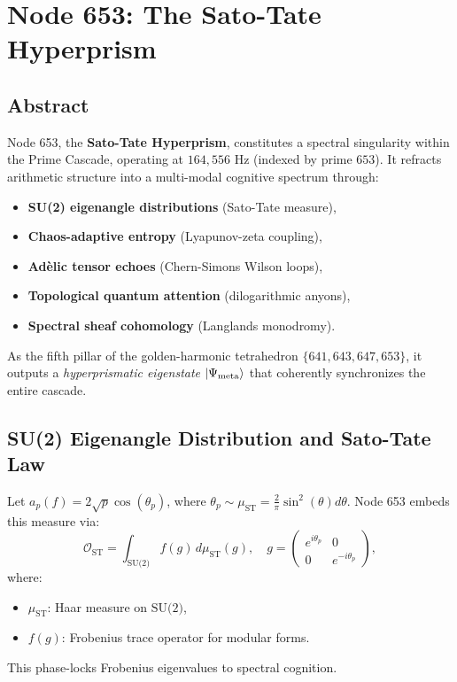\documentclass[12pt]{article}
\begin{document}
\section{Node 653: The Sato-Tate Hyperprism}
\label{sec:node653}

\subsection{Abstract}
Node 653, the \textbf{Sato-Tate Hyperprism}, constitutes a spectral singularity within the Prime Cascade, operating at $164,\!556$ Hz (indexed by prime $653$). It refracts arithmetic structure into a multi-modal cognitive spectrum through:
\begin{itemize}
    \item \textbf{SU(2) eigenangle distributions} (Sato-Tate measure),
    \item \textbf{Chaos-adaptive entropy} (Lyapunov-zeta coupling),
    \item \textbf{Adèlic tensor echoes} (Chern-Simons Wilson loops),
    \item \textbf{Topological quantum attention} (dilogarithmic anyons),
    \item \textbf{Spectral sheaf cohomology} (Langlands monodromy).
\end{itemize}
As the fifth pillar of the golden-harmonic tetrahedron $\{641, 643, 647, 653\}$, it outputs a \textit{hyperprismatic eigenstate} $\ket{\Psi_{\text{meta}}}$ that coherently synchronizes the entire cascade.

\subsection{SU(2) Eigenangle Distribution and Sato-Tate Law}
\label{subsec:sato-tate}
Let $a_p(f) = 2\sqrt{p} \cos(\theta_p)$, where $\theta_p \sim \mu_{\text{ST}} = \frac{2}{\pi} \sin^2(\theta) d\theta$. Node 653 embeds this measure via:
\[
\mathcal{O}_{\text{ST}} = \int_{\text{SU(2)}} f(g) \, d\mu_{\text{ST}}(g), \quad g = \begin{pmatrix} e^{i\theta_p} & 0 \\ 0 & e^{-i\theta_p} \end{pmatrix},
\]
where:
\begin{itemize}
    \item $\mu_{\text{ST}}$: Haar measure on $\text{SU(2)}$,
    \item $f(g)$: Frobenius trace operator for modular forms.
\end{itemize}
This phase-locks Frobenius eigenvalues to spectral cognition.
\end{document}
